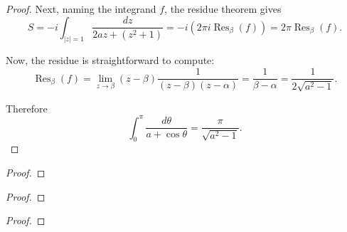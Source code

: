 \documentclass{article}
\newenvironment{problem}[2][Problem]{\begin{trivlist}
\item[\hskip \labelsep {\bfseries #1}\hskip \labelsep {\bfseries #2.}]}{\end{trivlist}}
\begin{document}
\begin{proof}
  Next, naming the integrand $f$, the residue theorem gives \[
    S = -i\int_{|z| = 1} \frac{dz}{2az + \left(z^2 + 1\right)} = -i(2\pi i \operatorname{Res}_\beta(f)) = 2\pi \operatorname{Res}_\beta(f).
  \]

  Now, the residue is straightforward to compute: \[
    \operatorname{Res}_\beta(f)
    = \lim_{z \rightarrow \beta} (z - \beta)\frac{1}{(z - \beta)(z - \alpha)}
    = \frac{1}{\beta - \alpha}
    = \frac{1}{2\sqrt{a^2 - 1}}.
  \]

  Therefore \[
    \int_0^\pi \frac{d\theta}{a + \cos\theta} = \frac{\pi}{\sqrt{a^2 - 1}}.
  \]
\end{proof}

\pagebreak

\begin{problem}{2}
\end{problem}

\begin{proof}
\end{proof}

\pagebreak

\begin{problem}{3}
\end{problem}

\begin{proof}
\end{proof}

\pagebreak

\begin{problem}{4}
\end{problem}

\begin{proof}
\end{proof}
\end{document}

